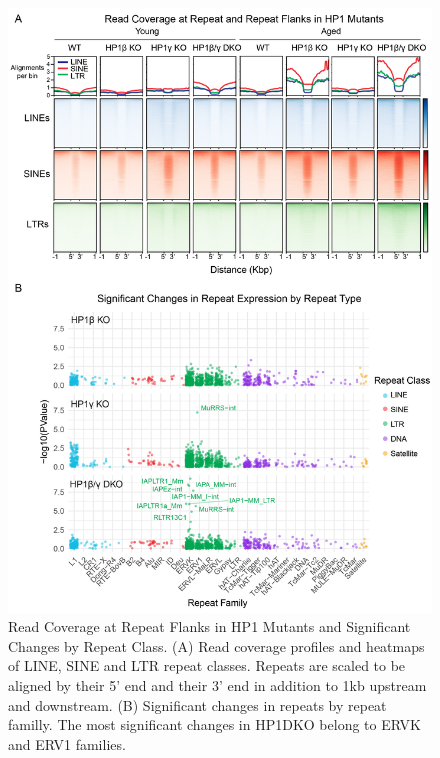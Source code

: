 \documentclass[onehalf,12pt]{beavtex}
\begin{document}
  \begin{figure}
  
  {\centering \includegraphics[width=1\linewidth, ]{./figure/results/Repeatcovsig} 
  
  }
  
  \caption[Read Coverage at Repeat Flanks in HP1 Mutants and Significant Changes by Repeat Class]{Read Coverage at Repeat Flanks in HP1 Mutants and Significant Changes by Repeat Class. (A) Read coverage profiles and heatmaps of LINE, SINE and LTR repeat classes.  Repeats are scaled to be aligned by their 5' end and their 3' end in addition to 1kb upstream and downstream. (B) Significant changes in repeats by repeat familly.  The most significant changes in HP1DKO belong to ERVK and ERV1 families.}\label{fig:readcov}
  \end{figure}
  
  \FloatBarrier
  \clearpage
  
\end{document}
